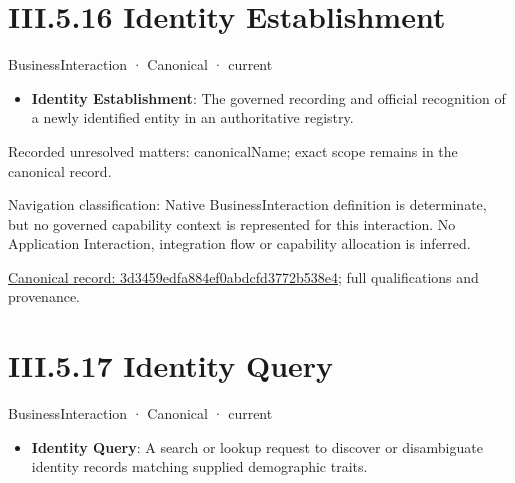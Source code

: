 \section*{III.5.16 Identity Establishment}
\label{navigation:III.5.16}

\label{element:3d3459edfa884ef0abdcfd3772b538e4}
{\small BusinessInteraction · Canonical · current}\par

\begin{itemize}


\item \textbf{Identity Establishment}: The governed recording and official recognition of a newly identified entity in an authoritative registry.

\end{itemize}

{\small Recorded unresolved matters: canonicalName; exact scope remains in the canonical record.}\par
{\small Navigation classification: Native BusinessInteraction definition is determinate, but no governed capability context is represented for this interaction. No Application Interaction, integration flow or capability allocation is inferred.}\par
{\footnotesize \href{../../../../../../../continuum/business/business-interaction/3d3459edfa884ef0abdcfd3772b538e4.md}{Canonical record: 3d3459edfa884ef0abdcfd3772b538e4}; full qualifications and provenance.}\par
\section*{III.5.17 Identity Query}
\label{navigation:III.5.17}

\label{element:d119aa62e95f4d7aa01822401ca4203c}
{\small BusinessInteraction · Canonical · current}\par

\begin{itemize}


\item \textbf{Identity Query}: A search or lookup request to discover or disambiguate identity records matching supplied demographic traits.

\end{itemize}

